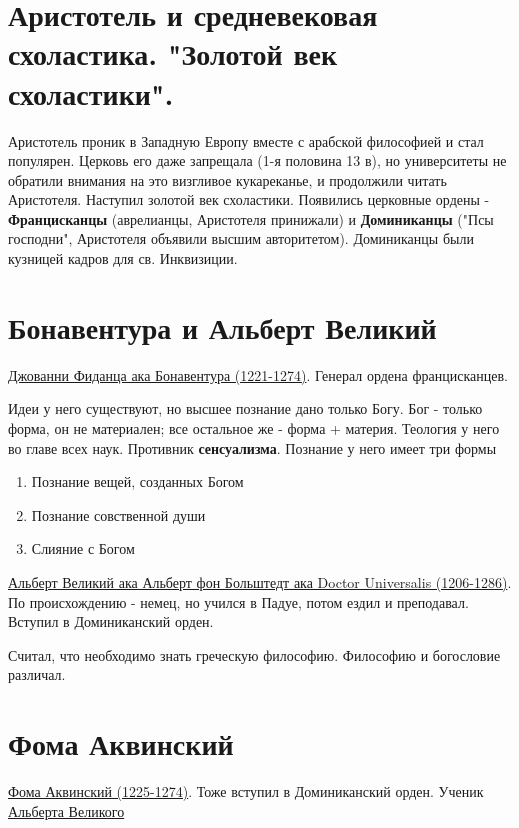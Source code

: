 \section{Аристотель и средневековая схоластика. "Золотой век схоластики".}
Аристотель проник в Западную Европу вместе с арабской философией и стал популярен. Церковь его даже запрещала (1-я половина 13 в), но университеты не обратили внимания на это визгливое кукареканье, и продолжили читать Аристотеля. Наступил золотой век схоластики. Появились церковные ордены - \textbf{Францисканцы} (аврелианцы, Аристотеля принижали) и \textbf{Доминиканцы} ("Псы господни", Аристотеля объявили высшим авторитетом). Доминиканцы были кузницей кадров для св. Инквизиции.

\section{Бонавентура и Альберт Великий}
\hspace{8pt} 
\underline{Джованни Фиданца ака Бонавентура (1221-1274)}. Генерал ордена францисканцев. 

Идеи у него существуют, но высшее познание дано только Богу. Бог - только форма, он не материален; все остальное же - форма + материя. Теология у него во главе всех наук. Противник \textbf{сенсуализма}. Познание у него имеет три формы
\begin{enumerate}
\item Познание вещей, созданных Богом
\item Познание совственной души
\item Слияние с Богом
\end{enumerate}


\underline{Альберт Великий  ака Альберт фон Больштедт ака Doctor Universalis (1206-1286)}. По происхождению - немец, но учился в Падуе, потом ездил и преподавал. Вступил в Доминиканский орден.

Считал, что необходимо знать греческую философию. Философию и богословие различал. 

\section{Фома Аквинский}
\hspace{8pt} 
\underline{Фома Аквинский (1225-1274)}. Тоже вступил в Доминиканский орден. Ученик \underline{Альберта Великого} 

